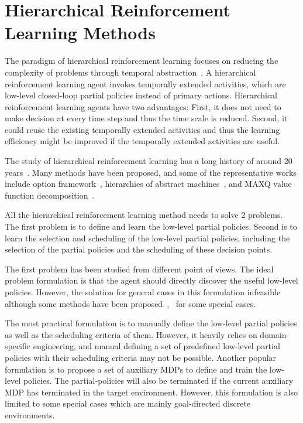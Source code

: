 \section{Hierarchical Reinforcement Learning Methods}

The paradigm of hierarchical reinforcement learning focuses on reducing the complexity of problems through temporal abstraction~\cite{barto2003recent}. A hierarchical reinforcement learning agent invokes temporally extended activities, which are low-level closed-loop partial policies instead of primary actions. Hierarchical reinforcement learning agents have two advantages: First, it does not need to make decision at every time step and thus the time scale is reduced. Second, it could reuse the existing temporally extended activities and thus the learning efficiency might be improved if the temporally extended activities are useful.

The study of hierarchical reinforcement learning has a long history of around 20 years~\cite{sutton1999between}. Many methods have been proposed,  and some of the representative works include option framework~\cite{sutton1999between}, hierarchies of abstract machines~\cite{parr1998reinforcement}, and MAXQ value function decomposition~\cite{dietterich2000hierarchical}.

All the hierarchical reinforcement learning method needs to solve 2 problems. The first problem is to define and learn the low-level partial policies. Second is to learn the selection and scheduling of the low-level partial policies, including the selection of the partial policies and the scheduling of these decision points.

The first problem has been studied from different point of views. The ideal problem formulation is that the agent should directly discover the useful low-level policies. However, the solution for general cases in this formulation infeasible although some methods have been proposed~\cite{mcgovern2001automatic},~\cite{hengst2002discovering} for some special cases. 

The most practical formulation is to manually define the low-level partial policies as well as the scheduling criteria of them. However, it heavily relies on domain-specific engineering, and manual defining a set of predefined low-level partial policies with their scheduling criteria may not be possible. Another popular formulation is to propose a set of auxiliary MDPs to define and train the low-level policies. The partial-policies will also be terminated if the current auxiliary MDP has terminated in the target environment. However, this formulation is also limited to some special cases which are mainly goal-directed discrete environments. 

